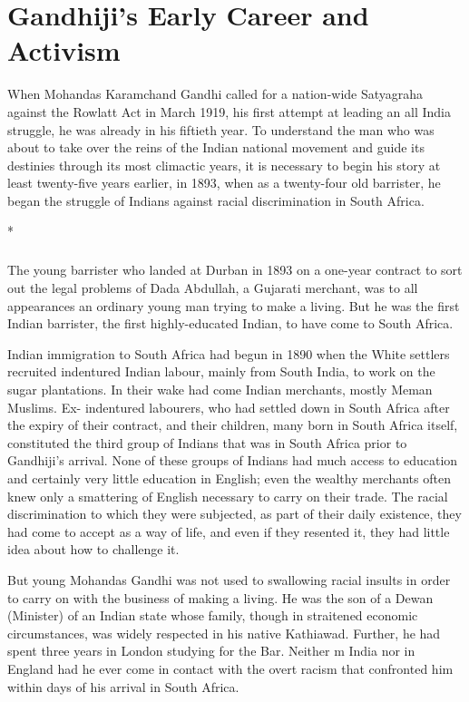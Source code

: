 \chapter{Gandhiji's Early Career and Activism}
\begin{multicols}{2}

When Mohandas Karamchand Gandhi called for a nation-wide Satyagraha against the Rowlatt Act in March 1919, his first attempt at leading an all India struggle, he was already in his fiftieth year. To understand the man who was about to take over the reins of the Indian national movement and guide its destinies through its most climactic years, it is necessary to begin his story at least twenty-five years earlier, in 1893, when as a twenty-four old barrister, he began the struggle of Indians against racial discrimination in South Africa.

\begin{center}*\end{center}

\paragraph*{}

The young barrister who landed at Durban in 1893 on a one-year contract to sort out the legal problems of Dada Abdullah, a Gujarati merchant, was to all appearances an ordinary young man trying to make a living. But he was the first Indian barrister, the first highly-educated Indian, to have come to South Africa.

Indian immigration to South Africa had begun in 1890 when the White settlers recruited indentured Indian labour, mainly from South India, to work on the sugar plantations. In their wake had come Indian merchants, mostly Meman Muslims. Ex- indentured labourers, who had settled down in South Africa after the expiry of their contract, and their children, many born in South Africa itself, constituted the third group of Indians that was in South Africa prior to Gandhiji's arrival. None of these groups of Indians had much access to education and certainly very little education in English; even the wealthy merchants often knew only a smattering of English necessary to carry on their trade. The racial discrimination to which they were subjected, as part of their daily existence, they had come to accept as a way of life, and even if they resented it, they had little idea about how to challenge it.

But young Mohandas Gandhi was not used to swallowing racial insults in order to carry on with the business of making a living. He was the son of a Dewan (Minister) of an Indian state whose family, though in straitened economic circumstances, was widely respected in his native Kathiawad. Further, he had spent three years in London studying for the Bar. Neither m India nor in England had he ever come in contact with the overt racism that confronted him within days of his arrival in South Africa.


\end{multicols}
